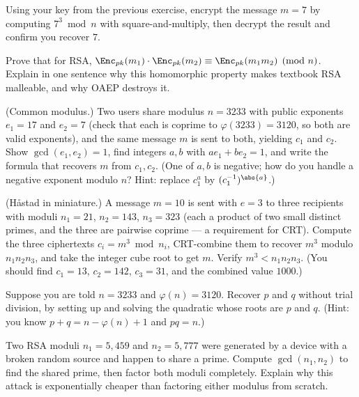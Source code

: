 \begin{exercise}
Using your key from the previous exercise, encrypt the message $m=7$ by computing $7^{3}\bmod n$ with square-and-multiply, then decrypt the result and confirm you recover $7$.
\end{exercise}

\begin{exercise}
Prove that for RSA, $\Enc_{pk}(m_1)\cdot\Enc_{pk}(m_2)\equiv \Enc_{pk}(m_1 m_2)\pmod n$. Explain in one sentence why this homomorphic property makes textbook RSA malleable, and why OAEP destroys it.
\end{exercise}

\begin{exercise}
(Common modulus.) Two users share modulus $n=3233$ with public exponents $e_1=17$ and $e_2=7$ (check that each is coprime to $\varphi(3233)=3120$, so both are valid exponents), and the same message $m$ is sent to both, yielding $c_1$ and $c_2$. Show $\gcd(e_1,e_2)=1$, find integers $a,b$ with $a e_1+b e_2=1$, and write the formula that recovers $m$ from $c_1,c_2$. (One of $a,b$ is negative; how do you handle a negative exponent modulo $n$? Hint: replace $c_1^{a}$ by $(c_1^{-1})^{\abs{a}}$.)
\end{exercise}

\begin{exercise}
(H\r{a}stad in miniature.) A message $m=10$ is sent with $e=3$ to three recipients with moduli $n_1=21$, $n_2=143$, $n_3=323$ (each a product of two small distinct primes, and the three are pairwise coprime --- a requirement for CRT). Compute the three ciphertexts $c_i = m^3\bmod n_i$, CRT-combine them to recover $m^3$ modulo $n_1 n_2 n_3$, and take the integer cube root to get $m$. Verify $m^3 < n_1 n_2 n_3$. (You should find $c_1=13$, $c_2=142$, $c_3=31$, and the combined value $1000$.)
\end{exercise}

\begin{exercise}
Suppose you are told $n=3233$ and $\varphi(n)=3120$. Recover $p$ and $q$ without trial division, by setting up and solving the quadratic whose roots are $p$ and $q$. (Hint: you know $p+q = n-\varphi(n)+1$ and $pq=n$.)
\end{exercise}

\begin{exercise}
Two RSA moduli $n_1 = 5{,}459$ and $n_2 = 5{,}777$ were generated by a device with a broken random source and happen to share a prime. Compute $\gcd(n_1,n_2)$ to find the shared prime, then factor both moduli completely. Explain why this attack is exponentially cheaper than factoring either modulus from scratch.
\end{exercise}

